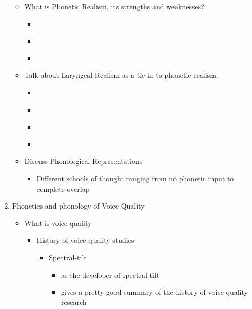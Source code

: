 \documentclass[12pt, letterpaper]{article}
\begin{document}
\begin{enumerate}
\begin{itemize}
        \item What is Phonetic Realism, its strengths and weaknesses? 
        \begin{itemize}
            \item \cite{katzRoutledgeHandbookPhonetics2019}
            \item \cite{knightCambridgeHandbookPhonetics2021}
            \item \cite{fowlerRealismUnrealismReply1983}
        \end{itemize} 
        \item Talk about Laryngeal Realism as a tie in to phonetic realism.
        \begin{itemize}
        \item \cite{iversonAspirationLaryngealRepresentation1995}
        \item \cite{honeyboneDiachronicEvidenceSegmental2005}
        \item \cite{beckmanRateEffectsSwedish2011}
        \item \cite{beckmanEmpiricalEvidenceLaryngeal2013}
        \end{itemize}
        \item Discuss Phonological Representations
        \begin{itemize}
            \item Different schools of thought ranging from no phonetic input to complete overlap \citep{albrightIdentificationBasesMorphological2002,flemmingScalarCategoricalPhenomena2001,reissSubstanceFreePhonology2017}
        \end{itemize}
    \end{itemize}
    \item Phonetics and phonology of Voice Quality
    \begin{itemize}
        \item What is voice quality
        \begin{itemize}
            \item History of voice quality studies
            \begin{itemize}
                \item Spectral-tilt
                \begin{itemize}
                    \item \citet{fischer-jorgensenPhoneticAnalysisBreathy1968} as the developer of spectral-tilt
                    \item \cite{garellekTheoreticalAchievementsPhonetics2022} gives a pretty good summary of the history of voice quality research

\end{itemize}
\end{itemize}
\end{itemize}
\end{itemize}
\end{enumerate}
\end{document}
